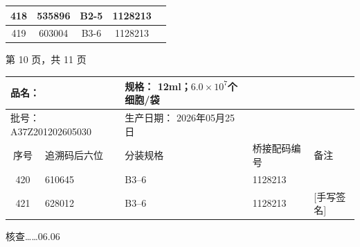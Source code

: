\documentclass[UTF8,10pt,a4paper,fontset=fandol]{ctexart}
\newcommand{\fieldvalue}[1]{#1}
\newcommand{\handwritten}[1]{#1}
\begin{document}
\begin{center}
\begin{tabular}{|c|c|c|c|c|}
\fieldvalue{418} &
\fieldvalue{535896} &
\fieldvalue{B2-5} &
\fieldvalue{1128213} & \\ \hline

\fieldvalue{419} &
\fieldvalue{603004} &
\fieldvalue{B3-6} &
\fieldvalue{1128213} & \\ \hline
\end{tabular}

\vspace{0.5em}

第 10 页，共 11 页
\end{center}

\newpage

\begin{center}
\small
\begin{tabular}{|c|p{3.0cm}|p{2.3cm}|p{2.8cm}|p{2.6cm}|}
\hline
\multicolumn{2}{|l|}{品名：%
\fieldvalue{\text{[品名辨识不清]}}} &
规格：%
\fieldvalue{12ml；$6.0\times 10^{7}$个细胞/袋} &
\multicolumn{2}{l|}{} \\
\hline
\multicolumn{2}{|l|}{批号：%
\fieldvalue{A37Z201202605030}} &
生产日期：%
\fieldvalue{2026年05月25日} &
\multicolumn{2}{l|}{} \\
\hline
序号 & 追溯码后六位 & 分装规格 & 桥接配码编号 & 备注 \\
\hline
\fieldvalue{420} &
\fieldvalue{610645} &
\fieldvalue{B3--6} &
\fieldvalue{1128213} &
\\
\hline
\fieldvalue{421} &
\fieldvalue{628012} &
\fieldvalue{B3--6} &
\fieldvalue{1128213} &
\fieldvalue{\handwritten{[手写签名]}} \\
\hline
\end{tabular}
\end{center}

\handwritten{核查……06.06}
\end{document}
